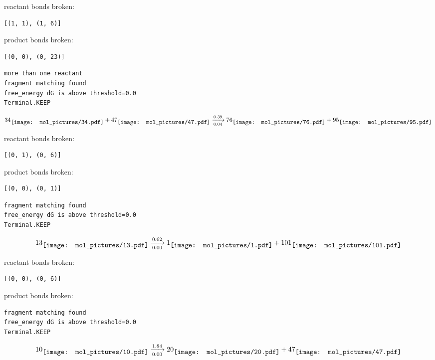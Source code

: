\documentclass{article}
\begin{document}
reactant bonds broken:\begin{verbatim}
[(1, 1), (1, 6)]
\end{verbatim}
product bonds broken:\begin{verbatim}
[(0, 0), (0, 23)]
\end{verbatim}




\vspace{1cm}
\begin{verbatim}
more than one reactant
fragment matching found
free_energy dG is above threshold=0.0
Terminal.KEEP
\end{verbatim}
$$
34
\raisebox{-.5\height}{\texttt{[image: mol\_pictures/34.pdf]}}
+
47
\raisebox{-.5\height}{\texttt{[image: mol\_pictures/47.pdf]}}
\xrightarrow[0.04]{0.39}
76
\raisebox{-.5\height}{\texttt{[image: mol\_pictures/76.pdf]}}
+
95
\raisebox{-.5\height}{\texttt{[image: mol\_pictures/95.pdf]}}
$$


reactant bonds broken:\begin{verbatim}
[(0, 1), (0, 6)]
\end{verbatim}
product bonds broken:\begin{verbatim}
[(0, 0), (0, 1)]
\end{verbatim}




\vspace{1cm}
\begin{verbatim}
fragment matching found
free_energy dG is above threshold=0.0
Terminal.KEEP
\end{verbatim}
$$
13
\raisebox{-.5\height}{\texttt{[image: mol\_pictures/13.pdf]}}
\xrightarrow[0.00]{0.62}
1
\raisebox{-.5\height}{\texttt{[image: mol\_pictures/1.pdf]}}
+
101
\raisebox{-.5\height}{\texttt{[image: mol\_pictures/101.pdf]}}
$$


reactant bonds broken:\begin{verbatim}
[(0, 0), (0, 6)]
\end{verbatim}
product bonds broken:



\vspace{1cm}
\begin{verbatim}
fragment matching found
free_energy dG is above threshold=0.0
Terminal.KEEP
\end{verbatim}
$$
10
\raisebox{-.5\height}{\texttt{[image: mol\_pictures/10.pdf]}}
\xrightarrow[0.00]{1.84}
20
\raisebox{-.5\height}{\texttt{[image: mol\_pictures/20.pdf]}}
+
47
\raisebox{-.5\height}{\texttt{[image: mol\_pictures/47.pdf]}}
$$
\end{document}
